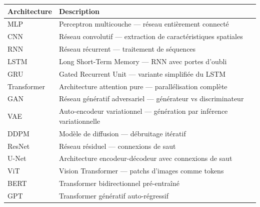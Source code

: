 \documentclass[12pt,a4paper,twoside]{book}
\theoremstyle{definition}
\theoremstyle{plain}
\theoremstyle{remark}
\begin{document}
\begin{longtable}{lp{10cm}}
\toprule
\textbf{Architecture} & \textbf{Description} \\
\midrule
\endhead
MLP & Perceptron multicouche --- r\'eseau enti\`erement connect\'e \\
CNN & R\'eseau convolutif --- extraction de caract\'eristiques spatiales \\
RNN & R\'eseau r\'ecurrent --- traitement de s\'equences \\
LSTM & Long Short-Term Memory --- RNN avec portes d'oubli \\
GRU & Gated Recurrent Unit --- variante simplifi\'ee du LSTM \\
Transformer & Architecture attention pure --- parall\'elisation compl\`ete \\
GAN & R\'eseau g\'en\'eratif adversariel --- g\'en\'erateur vs discriminateur \\
VAE & Auto-encodeur variationnel --- g\'en\'eration par inf\'erence variationnelle \\
DDPM & Mod\`ele de diffusion --- d\'ebruitage it\'eratif \\
ResNet & R\'eseau r\'esiduel --- connexions de saut \\
U-Net & Architecture encodeur-d\'ecodeur avec connexions de saut \\
ViT & Vision Transformer --- patchs d'images comme tokens \\
BERT & Transformer bidirectionnel pr\'e-entra\^in\'e \\
GPT & Transformer g\'en\'eratif auto-r\'egressif \\
\bottomrule
\end{longtable}
\end{document}
